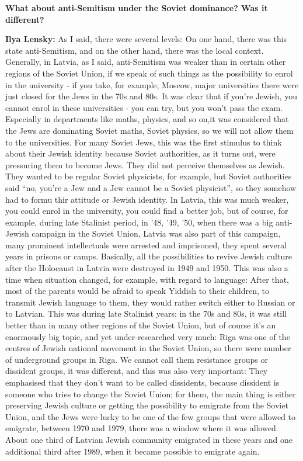 \textbf{What about anti-Semitism under the Soviet dominance? Was it different?}

\textbf{Ilya Lensky:} As I said, there were several levels: On one hand, there was this state anti-Semitism, and on the other hand, there was the local context. Generally, in Latvia, as I said, anti-Semitism was weaker than in certain other regions of the Soviet Union, if we speak of such things as the possibility to enrol in the university - if you take, for example, Moscow, major universities there were just closed for the Jews in the 70s and 80s. It was clear that if you’re Jewish, you cannot enrol in these universities - you can try, but you won’t pass the exam. Especially in departments like maths, physics, and so on,it was considered that the Jews are dominating Soviet maths, Soviet physics, so we will not allow them to the universities. For many Soviet Jews, this was the first stimulus to think about their Jewish identity because Soviet authorities, as it turns out, were pressuring them to become Jews. They did not perceive themselves as Jewish. They wanted to be regular Soviet physicists, for example, but Soviet authorities said ``no, you’re a Jew and a Jew cannot be a Soviet physicist'', so they somehow had to formu thir attitude or Jewish identity. In Latvia, this was much weaker, you could enrol in the university, you could find a better job, but of course, for example, during late Stalinist period, in '48, '49, '50, when there was a big anti-Jewish campaign in the Soviet Union, Latvia was also part of this campaign, many prominent intellectuals were arrested and imprisoned, they spent several years in prisons or camps. Basically, all the possibilities to revive  Jewish culture after the Holocaust in Latvia were destroyed in 1949 and 1950. This was also a time when situation changed, for example, with regard to language: After that, most of the parents would be afraid to speak Yiddish to their children, to transmit Jewish language to them, they would rather switch either to Russian or to Latvian. This was during late Stalinist years; in the 70s and 80s, it was still better than in many other regions of the Soviet Union, but of course it’s an enormously big topic, and yet under-researched very much: Riga was one of the centres of Jewish national movement in the Soviet Union, so there were number of underground groups in Riga. We cannot call them resistance groups or dissident groups, it was different, and this was also very important: They emphasised that they don’t want to be called dissidents, because dissident is someone who tries to change the Soviet Union; for them, the main thing is either preserving Jewish culture or getting the possibility to emigrate from the Soviet Union, and the Jews were lucky to be one of the few groups that were allowed to emigrate, between 1970 and 1979, there was a window where it was allowed. About one third of Latvian Jewish community emigrated in these years and one additional third after 1989, when it became possible to emigrate again. 

